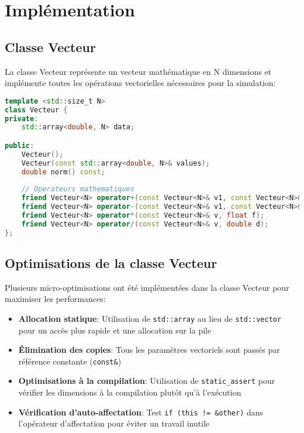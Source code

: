 \documentclass[12pt,a4paper]{article}
\begin{document}
\section{Implémentation}

\subsection{Classe Vecteur}

La classe Vecteur représente un vecteur mathématique en N dimensions et implémente toutes les opérations vectorielles nécessaires pour la simulation:

\begin{lstlisting}[language=C++, caption=Extrait de la classe Vecteur]
template <std::size_t N>
class Vecteur {
private:
    std::array<double, N> data;

public:
    Vecteur();
    Vecteur(const std::array<double, N>& values);
    double norm() const;
    
    // Operateurs mathematiques
    friend Vecteur<N> operator+(const Vecteur<N>& v1, const Vecteur<N>& v2);
    friend Vecteur<N> operator-(const Vecteur<N>& v1, const Vecteur<N>& v2);
    friend Vecteur<N> operator*(const Vecteur<N>& v, float f);
    friend Vecteur<N> operator/(const Vecteur<N>& v, double d);
};
\end{lstlisting}

\subsection{Optimisations de la classe Vecteur}

Plusieurs micro-optimisations ont été implémentées dans la classe Vecteur pour maximiser les performances:

\begin{itemize}
    \item \textbf{Allocation statique}: Utilisation de \texttt{std::array} au lieu de \texttt{std::vector} pour un accès plus rapide et une allocation sur la pile
    \item \textbf{Élimination des copies}: Tous les paramètres vectoriels sont passés par référence constante (\texttt{const\&})
    \item \textbf{Optimisations à la compilation}: Utilisation de \texttt{static\_assert} pour vérifier les dimensions à la compilation plutôt qu'à l'exécution
    \item \textbf{Vérification d'auto-affectation}: Test \texttt{if (this != \&other)} dans l'opérateur d'affectation pour éviter un travail inutile
\end{itemize}
\end{document}
